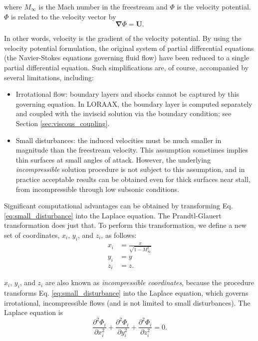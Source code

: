 \documentclass[11pt]{article}
\begin{document}
\noindent where $M_\infty$ is the Mach number in the freestream and $\Phi$ is
the velocity potential. $\Phi$ is related to the velocity vector by
\begin{equation}
	\mathbf{\nabla}\Phi = \mathbf{U}.
	\label{eq:velocity_potential}
\end{equation}

\noindent In other words, velocity is the gradient of the velocity potential. By
using the velocity potential formulation, the original system of partial
differential equations (the Navier-Stokes equations governing fluid flow) have
been reduced to a single partial differential equation. Such simplifications
are, of course, accompanied by several limitations, including:

\begin{itemize}
	\item Irrotational flow: boundary layers and shocks cannot be captured by
		this governing equation. In LORAAX, the boundary layer is computed
		separately and coupled with the inviscid solution via the boundary
		condition; see Section \ref{sec:viscous_coupling}.
	\item Small disturbances: the induced velocities must be much smaller in
		magnitude than the freestream velocity.
		This assumption sometimes implies thin surfaces at small angles of
		attack. However, the underlying \textit{incompressible} solution
		procedure is not subject to this assumption, and in practice acceptable
		results can be obtained even for thick surfaces near stall, from
		incompressible through low subsonic conditions.
\end{itemize}

Significant computational advantages can be obtained by transforming Eq.
\ref{eq:small_disturbance} into the Laplace equation. The Prandtl-Glauert
transformation does just that. To perform this transformation, we define a new
set of coordinates, $x_i$, $y_i$, and $z_i$, as follows:
\begin{align}
	\label{eq:prandtl_glauert_transform}
	x_i & = \frac{x}{\sqrt{1 - M_\infty^2}} \\ \nonumber
	y_i & = y \\ \nonumber
	z_i & = z. \nonumber
\end{align}

\noindent $x_i$, $y_i$, and $z_i$ are also known as \textit{incompressible
coordinates}, because the procedure transforms Eq. \ref{eq:small_disturbance}
into the Laplace equation, which governs irrotational, incompressible flows
(and is not limited to small disturbances). The Laplace equation is
\begin{equation}
	\frac{\partial^2\Phi_i}{\partial x_i^2} +
	\frac{\partial^2\Phi_i}{\partial y_i^2} +
	\frac{\partial^2\Phi_i}{\partial z_i^2} = 0.
	\label{eq:laplace}
\end{equation}
\end{document}
